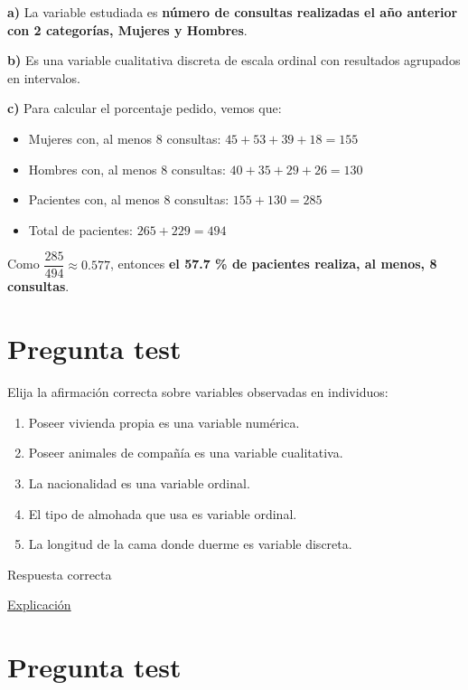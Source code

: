 \documentclass[
]{book}
\providecommand{\tightlist}{%
  \setlength{\itemsep}{0pt}\setlength{\parskip}{0pt}}
\begin{document}
\textbf{a)} La variable estudiada es \textbf{número de consultas realizadas el año anterior con 2 categorías, Mujeres y Hombres}.

\textbf{b)} Es una variable cualitativa discreta de escala ordinal con resultados agrupados en intervalos.

\textbf{c)} Para calcular el porcentaje pedido, vemos que:

\begin{itemize}
\item
  Mujeres con, al menos 8 consultas: \(45 + 53 + 39 + 18 = 155\)
\item
  Hombres con, al menos 8 consultas: \(40 + 35 + 29 + 26 = 130\)
\item
  Pacientes con, al menos 8 consultas: \(155 + 130 = 285\)
\item
  Total de pacientes: \(265 + 229 = 494\)
\end{itemize}

Como \(\dfrac{285}{494} \approx 0.577\), entonces \textbf{el 57.7 \% de pacientes realiza, al menos, 8 consultas}.

\hypertarget{pregunta-test-13}{%
\section{Pregunta test}\label{pregunta-test-13}}

Elija la afirmación correcta sobre variables observadas en individuos:

\begin{enumerate}
\def\labelenumi{\alph{enumi})}
\tightlist
\item
  Poseer vivienda propia es una variable numérica.
\item
  Poseer animales de compañía es una variable cualitativa.
\item
  La nacionalidad es una variable ordinal.
\item
  El tipo de almohada que usa es variable ordinal.
\item
  La longitud de la cama donde duerme es variable discreta.
\end{enumerate}

Respuesta correcta

\href{https://1fjmanzano.github.io/bioestadistica/tipos-de-variables.html}{Explicación}

\hypertarget{pregunta-test-14}{%
\section{Pregunta test}\label{pregunta-test-14}}
\end{document}
